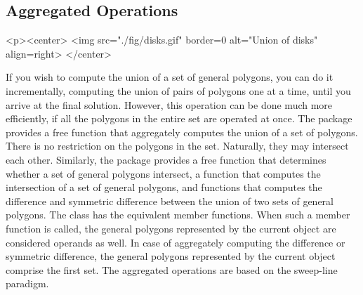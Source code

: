 \subsection{Aggregated Operations}
\label{bso_ssec:}
\lcTex{%
  \setlength{\widthRight}{3.4cm}
  \setlength{\widthLeft}{\widthLineReal}
  \addtolength{\widthLeft}{-\widthRight}
  \begin{minipage}{\widthLeft}
}
\label{fig:disks}
\begin{ccHtmlOnly}
  <p><center>
    <img src="./fig/disks.gif" border=0 alt="Union of disks" align=right>
  </center>
\end{ccHtmlOnly}
If you wish to compute the union of a set of general polygons, you can
do it incrementally, computing the union of pairs of polygons one at a
time, until you arrive at the final solution. However, this operation
can be done much more efficiently, if all the polygons in the entire
set are operated at once. The package provides a free function that
aggregately computes the union of a set of polygons. There is no
restriction on the polygons in the set. Naturally, they may intersect
each other. Similarly, the package provides a free function that
determines whether a set of general polygons intersect, a function
that computes the intersection of a set of general polygons, and
functions that computes the difference and symmetric difference between 
the union of two sets of general
\\
polygons. The class  has the equivalent 
member functions. When such a member function is called, the general 
polygons represented by the current object are considered operands as 
well. In case of aggregately computing the difference or symmetric 
difference, the general polygons represented by the current object 
comprise the first set. The aggregated operations are based on the 
sweep-line paradigm. 

